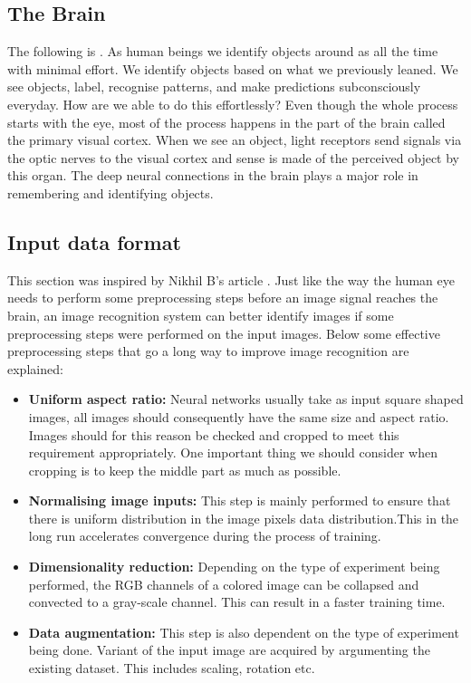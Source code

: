 \documentclass[12pt, a4paper,oneside]{report}
\begin{document}
\subsection{The Brain}
The following is . As human beings we identify objects around as all the time with minimal effort. We identify objects based on what we previously leaned. We see objects, label, recognise patterns, and make predictions subconsciously everyday. How are we able to do this effortlessly? Even though the whole process starts with the eye, most of the process happens in the part of the brain called the primary visual cortex. When we see an object, light receptors send signals via the optic nerves to the visual cortex and sense is made of the perceived object by this organ. The deep neural connections in the brain plays a major role in remembering and identifying objects.

\subsection{Input data format}
This section was inspired by Nikhil B's article \cite{input}. Just like the way the human eye needs to perform some preprocessing steps before an image signal reaches the brain, an image recognition system can better identify images if some preprocessing steps were performed on the input images. Below some effective preprocessing steps that go a long way to improve image recognition are explained:

\begin{itemize}
	
	\item \textbf{Uniform aspect ratio:}  Neural networks usually take as input square shaped images, all images should consequently have the same size and aspect ratio. Images should for this reason be checked and cropped to meet this requirement appropriately. One important thing we should consider when cropping is to keep the middle part as much as possible.
	
	\item \textbf{Normalising image inputs:} This step is mainly performed to ensure that there is uniform distribution in the image pixels data distribution.This in the long run accelerates convergence during the process of training. 

	\item \textbf{Dimensionality reduction:} Depending on the type of experiment being performed, the RGB channels of a colored image can be collapsed and convected to a gray-scale channel. This can result in a faster training time.
	
	\item \textbf{Data augmentation:} This step is also dependent on the type of experiment being done. Variant of the input image are acquired by argumenting the existing dataset. This includes scaling, rotation etc.
		
\end{itemize} 
\end{document}
